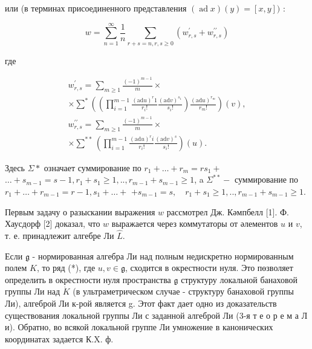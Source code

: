 \documentclass[10pt]{article}
\begin{document}
или (в терминах присоединенного представления $(\operatorname{ad} x)(y)=[x, y])$ :



\[

w=\sum_{n=1}^{\infty} \frac{1}{n} \sum_{r+s=n, r, s \geqslant 0}\left(w_{r, s}^{\prime}+w_{r, s}^{\prime \prime}\right)

\]



где



\[

\begin{gathered}

w_{r, s}^{\prime}=\sum_{m \geqslant 1} \frac{(-1)^{m-1}}{m} \times \\

\times \sum^{*}\left(\left(\prod_{i=1}^{m-1} \frac{(\mathrm{ad} u)^{r} 1}{r_{i} !} \frac{(\mathrm{ad} v)^{s_{1}}}{s_{i} !}\right) \frac{(\mathrm{ad} u)^{r_{m}}}{r_{m} !}\right)(v), \\

w_{r, s}^{\prime \prime}=\sum_{m \geqslant 1} \frac{(-1)^{m-1}}{m} \times \\

\times \sum^{* *}\left(\prod_{i=1}^{m-1} \frac{(\mathrm{ad} u)^{r} i}{r_{i} !} \frac{(\mathrm{ad} v)^{s}}{s_{i} !}\right)(u) .

\end{gathered}

\]



Здесь $\Sigma *$ означает суммирование по $r_{1}+\ldots+r_{m}=r s_{1}+$ $\ldots+s_{m-1}=s-1, r_{1}+s_{1} \geqslant 1, . ., r_{m-1}+s_{m-1} \geqslant 1$, a $\Sigma^{* *}-$ суммирование по $r_{1}+\ldots+r_{m-1}=r-1, s_{1}+\ldots+$ $+s_{m-1}=s, \quad r_{1}+s_{1} \geqslant 1, . ., r_{m-1}+s_{m-1} \geqslant 1$.



Первым задачу о разыскании выражения $w$ рассмотрел Дж. Кәмпбелл [1]. Ф. Хаусдорф [2] доказал, что $w$ выражается через коммутаторы от әлементов $u$ и $v$, т. е. принадлежит алгебре Ли $\hat{L}$.



Если $\mathfrak{g}$ - нормированная алгебра Ли над полным недискретно нормированным полем $K$, то ряд (*), где $u, v \in \mathfrak{g}$, сходится в окрестности нуля. Это пөзволяет определить в окрестности нуля пространства $\mathfrak{g}$ структуру локальной банаховой группы Ли над $\dot{K}$ (в ультраметрическом случае - структуру банаховой группы Ли), алгеброй Ли к-рой является g. Этот факт дает одно из доказательств существования локальной группы Ли с заданной алгеброй Ли (3-я т е о р е м а Л и). Обратно, во всякой локальной группе Ли умножение в канонических координатах задается К.X. ф.
\end{document}
